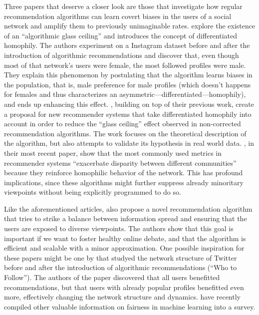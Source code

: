 Three papers that deserve a closer look are those that investigate how regular
recommendation algorithms can learn covert biases in the users of a social
network and amplify them to previously unimaginable rates.
\citet{stoica_algorithmic_2018} explore the existence of an ``algorithmic glass
ceiling'' and introduces the concept of differentiated homophily. The authors
experiment on a Instagram dataset before and after the introduction of
algorithmic recommendations and discover that, even though most of that
network's users were female, the most followed profiles were male. They explain
this phenomenon by postulating that the algorithm learns biases in the
population, that is, male preference for male profiles (which doesn't happens
for females and thus characterizes an asymmetric---differentiated---homophily),
and ends up enhancing this effect. \citet{stoica_hegemony_2019}, building on top
of their previous work, create a proposal for new recommender systems that take
differentiated homophily into account in order to reduce the ``glass ceiling''
effect observed in non-corrected recommendation algorithms. The work focuses on
the theoretical description of the algorithm, but also attempts to validate its
hypothesis in real world data. \citet{stoica_algorithmic_2020}, in their most
recent paper, show that the most commonly used metrics in recommender systems
``exacerbate disparity between different communities'' because they reinforce
homophilic behavior of the network. This has profound implications, since these
algorithms might further suppress already minoritary viewpoints without being
explicitly programmed to do so.

Like the aforementioned articles, \citet{matakos_maximizing_2020} also propose a
novel recommendation algorithm that tries to strike a balance between
information spread and ensuring that the users are exposed to diverse
viewpoints. The authors show that this goal is important if we want to foster
healthy online debate, and that the algorithm is efficient and scalable with a
minor approximation. One possible inspiration for these papers might be one by
\citet{su_effect_2016} that studyed the network structure of Twitter before and
after the introduction of algorithmic recommendations (``Who to Follow''). The
authors of the paper discovered that all users benefitted recommendations, but
that users with already popular profiles benefitted even more, effectively
changing the network structure and dynamics. \citet{caton_fairness_2020} have
recently compiled other valuable information on fairness in machine learning
into a survey.

